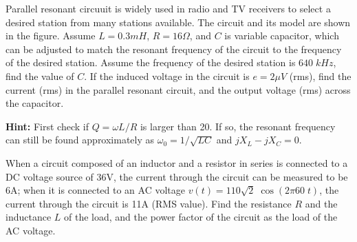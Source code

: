 \item Parallel resonant circuuit is widely used in radio and TV receivers
to select a desired station from many stations available. The circuit and
its model are shown in the figure. Assume $L=0.3mH$, $R=16\Omega$, and $C$
is variable capacitor, which can be adjusted to match the resonant 
frequency of the circuit to the frequency of the desired station. Assume 
the frequency of the desired station is $640\;kHz$, find the value of $C$.
If the induced voltage in the circuit is $e=2 \mu V$ (rms), find the 
current (rms) in the parallel resonant circuit, and the output voltage 
(rms) across the capacitor.


{\bf Hint:} First check if $Q=\omega L/R$ is larger than 20. If so, the
resonant frequency can still be found approximately as
$\omega_0=1/\sqrt{LC}$ and $jX_L-jX_C=0$.



\item When a circuit composed of an inductor and a resistor in series
is connected to a DC voltage source of 36V, the current through the 
circuit can be measured to be 6A; when it is connected to an AC voltage 
$v(t)=110 \sqrt{2}\;\cos(2\pi 60\;t)$, the current through the circuit 
is 11A (RMS value). Find the resistance $R$ and the inductance $L$
of the load, and the power factor of the circuit as the load of the AC
voltage. 


